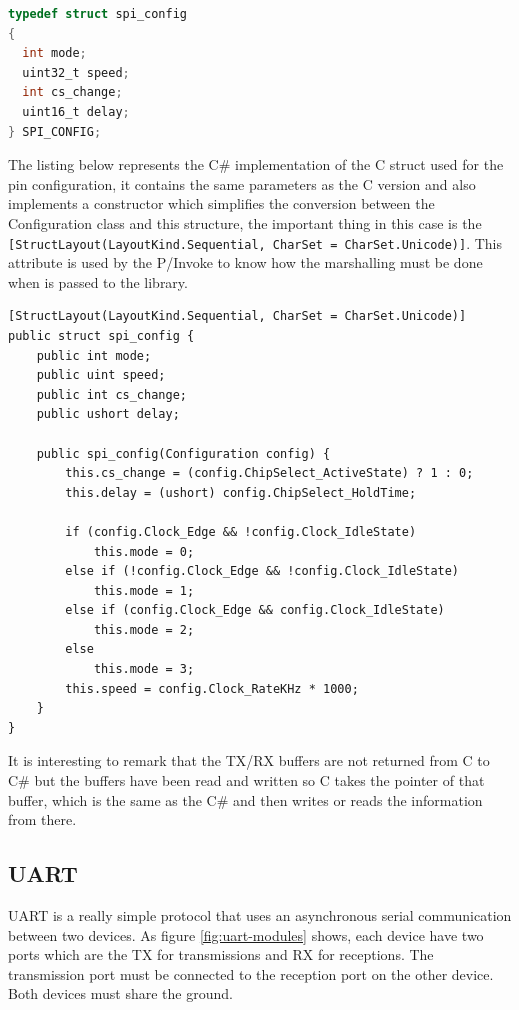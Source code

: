 \begin{lstlisting}[language=C, caption={IOSharp.h - spi\_config struct}]
typedef struct spi_config
{
  int mode;
  uint32_t speed;
  int cs_change;
  uint16_t delay;
} SPI_CONFIG;
\end{lstlisting}

The listing below represents the C\# implementation of the C struct used for the pin configuration, it contains the same parameters as the C version and also implements a constructor which simplifies the conversion between the Configuration class and this structure, the important thing in this case is the
\\
\verb![StructLayout(LayoutKind.Sequential, CharSet = CharSet.Unicode)]!. This attribute is used by the P/Invoke to know how the marshalling must be done when is passed to the library.

\begin{lstlisting}[language=CSharp, caption={SPI.cs - spi\_config struct}]
[StructLayout(LayoutKind.Sequential, CharSet = CharSet.Unicode)]
public struct spi_config {
    public int mode;
    public uint speed;
    public int cs_change;
    public ushort delay;

    public spi_config(Configuration config) {
        this.cs_change = (config.ChipSelect_ActiveState) ? 1 : 0;
        this.delay = (ushort) config.ChipSelect_HoldTime;

        if (config.Clock_Edge && !config.Clock_IdleState)
            this.mode = 0;
        else if (!config.Clock_Edge && !config.Clock_IdleState)
            this.mode = 1;
        else if (config.Clock_Edge && config.Clock_IdleState)
            this.mode = 2;
        else
            this.mode = 3;
        this.speed = config.Clock_RateKHz * 1000;
    }
}
\end{lstlisting}

It is interesting to remark that the \gls{TX}/\gls{RX} buffers are not returned from C to C\# but the buffers have been read and written so C takes the pointer of that buffer, which is the same as the C\# and then writes or reads the information from there. 

\subsection{UART}\label{SS:IOSharp-UART}
UART is a really simple protocol that uses an asynchronous serial communication between two devices. As figure \ref{fig:uart-modules} shows, each device have two ports which are the \gls{TX} for transmissions and \gls{RX} for receptions. The transmission port must be connected to the reception port on the other device. Both devices must share the ground.

